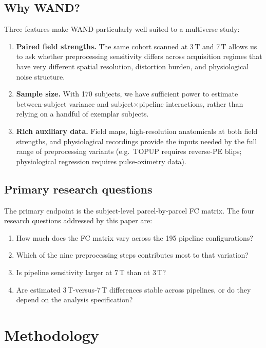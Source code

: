 \documentclass[11pt,a4paper]{article}
\begin{document}
\subsection{Why WAND?}

Three features make WAND particularly well suited to a multiverse study:
\begin{enumerate}[label=(\roman*)]
    \item \textbf{Paired field strengths.}  The same cohort scanned at 3\,T and 7\,T allows us to ask whether preprocessing sensitivity differs across acquisition regimes that have very different spatial resolution, distortion burden, and physiological noise structure.
    \item \textbf{Sample size.}  With 170 subjects, we have sufficient power to estimate between-subject variance and subject$\times$pipeline interactions, rather than relying on a handful of exemplar subjects.
    \item \textbf{Rich auxiliary data.}  Field maps, high-resolution anatomicals at both field strengths, and physiological recordings provide the inputs needed by the full range of preprocessing variants (e.g.\ TOPUP requires reverse-PE blips; physiological regression requires pulse-oximetry data).
\end{enumerate}

\subsection{Primary research questions}

The primary endpoint is the subject-level parcel-by-parcel FC matrix.  The four research questions addressed by this paper are:
\begin{enumerate}[label=\arabic*.]
    \item How much does the FC matrix vary across the 195 pipeline configurations?
    \item Which of the nine preprocessing steps contributes most to that variation?
    \item Is pipeline sensitivity larger at 7\,T than at 3\,T?
    \item Are estimated 3\,T-versus-7\,T differences stable across pipelines, or do they depend on the analysis specification?
\end{enumerate}

\section{Methodology}
\end{document}
